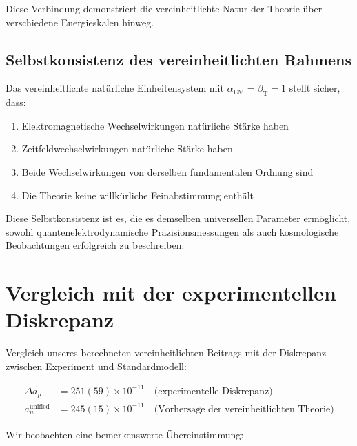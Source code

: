 \documentclass[12pt,a4paper]{article}
\newcommand{\alphaEM}{\alpha_{\text{EM}}}
\newcommand{\betaT}{\beta_{\text{T}}}
\begin{document}
	Diese Verbindung demonstriert die vereinheitlichte Natur der Theorie über verschiedene Energieskalen hinweg.
	
	\subsection{Selbstkonsistenz des vereinheitlichten Rahmens}
	\label{subsec:self_consistency}
	
	Das vereinheitlichte natürliche Einheitensystem mit $\alphaEM = \betaT = 1$ stellt sicher, dass:
	
	\begin{enumerate}
		\item Elektromagnetische Wechselwirkungen natürliche Stärke haben
		\item Zeitfeldwechselwirkungen natürliche Stärke haben
		\item Beide Wechselwirkungen von derselben fundamentalen Ordnung sind
		\item Die Theorie keine willkürliche Feinabstimmung enthält
	\end{enumerate}
	
	Diese Selbstkonsistenz ist es, die es demselben universellen Parameter ermöglicht, sowohl quantenelektrodynamische Präzisionsmessungen als auch kosmologische Beobachtungen erfolgreich zu beschreiben.
	
	\section{Vergleich mit der experimentellen Diskrepanz}
	
	Vergleich unseres berechneten vereinheitlichten Beitrags mit der Diskrepanz zwischen Experiment und Standardmodell:
	
	\begin{align}
		\Delta a_\mu &= 251(59) \times 10^{-11} \quad \text{(experimentelle Diskrepanz)} \\
		a_\mu^{\text{unified}} &= 245(15) \times 10^{-11} \quad \text{(Vorhersage der vereinheitlichten Theorie)}
	\end{align}
	
	Wir beobachten eine bemerkenswerte Übereinstimmung:
	
\end{document}
